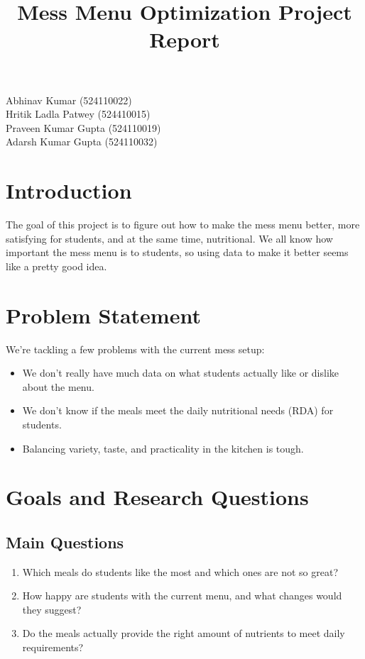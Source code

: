 \documentclass[12pt,a4paper]{article}
\title{\textbf{Mess Menu Optimization Project Report}}
\date{}
\begin{document}
\maketitle
\vspace{-1em} %
\begin{center}
    Abhinav Kumar (524110022) \\
    Hritik Ladla Patwey (524410015) \\ 
    Praveen Kumar Gupta (524110019) \\ 
    Adarsh Kumar Gupta (524110032) \\ 
\end{center}

\section{Introduction}
The goal of this project is to figure out how to make the mess menu better, more satisfying for students, and at the same time, nutritional. We all know how important the mess menu is to students, so using data to make it better seems like a pretty good idea.

\section{Problem Statement}
We’re tackling a few problems with the current mess setup:
\begin{itemize}
    \item We don’t really have much data on what students actually like or dislike about the menu.
    \item We don’t know if the meals meet the daily nutritional needs (RDA) for students.
    \item Balancing variety, taste, and practicality in the kitchen is tough.
\end{itemize}

\section{Goals and Research Questions}
\subsection{Main Questions}
\begin{enumerate}
    \item Which meals do students like the most and which ones are not so great?
    \item How happy are students with the current menu, and what changes would they suggest?
    \item Do the meals actually provide the right amount of nutrients to meet daily requirements?
\end{enumerate}
\end{document}

